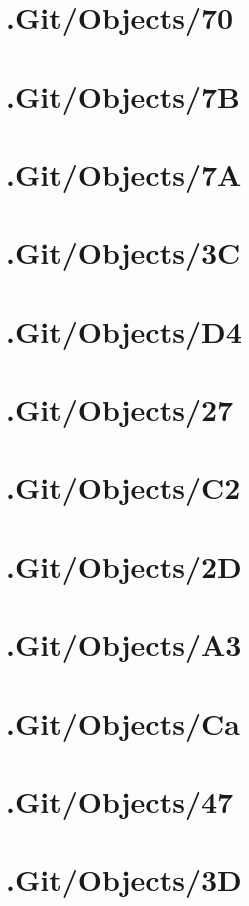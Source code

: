 \section*{.Git/Objects/70}

\section*{.Git/Objects/7B}

\section*{.Git/Objects/7A}

\section*{.Git/Objects/3C}

\section*{.Git/Objects/D4}

\section*{.Git/Objects/27}

\section*{.Git/Objects/C2}

\section*{.Git/Objects/2D}

\section*{.Git/Objects/A3}

\section*{.Git/Objects/Ca}

\section*{.Git/Objects/47}

\section*{.Git/Objects/3D}

